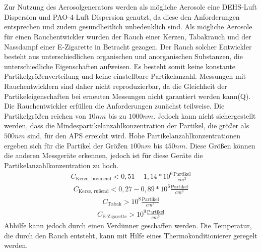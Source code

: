 \\\\
Zur Nutzung des Aerosolgenerators werden als m\"{o}gliche Aerosole eine DEHS-Luft Dispersion und PAO-4-Luft Dispersion genutzt, da diese den Anforderungen entsprechen und zudem gesundheitlich unbedenklich sind. Als m\"{o}gliche Aerosole f\"{u}r einen Rauchentwickler wurden der Rauch einer Kerzen, Tabakrauch und der Nassdampf einer E-Zigarette in Betracht gezogen. Der Rauch solcher Entwickler besteht aus unterschiedlichen organischen und anorganischen Substanzen, die unterschiedliche Eigenschaften aufweisen. Es besteht somit keine konstante Partikelgr\"{o}{\ss}enverteilung und keine einstellbare Partikelanzahl. Messungen mit Rauchentwicklern sind daher nicht reproduzierbar, da die Gleichheit der Partikeleigenschaften bei erneuten Messungen nicht garantiert werden kann(Q). Die Rauchentwickler erf\"{u}llen die Anforderungen zun\"{a}chst teilweise. Die Partikelgr\"{o}{\ss}en reichen von \(10 nm\) bis zu \(1000 nm\). Jedoch kann nicht sichergestellt werden, dass die Mindespartikelanzahlkonzentration der Partikel, die gr\"{o}{\ss}er als \(500 nm\) sind, f\"{u}r den APS erreicht wird. Hohe Partikelanzahlkonzentrationen ergeben sich f\"{u}r die Partikel der Gr\"{o}{\ss}en \(100 nm\) bis \(450 nm\). Diese Gr\"{o}{\ss}en k\"{o}nnen die anderen Messger\"{a}te erkennen, jedoch ist f\"{u}r diese Ger\"{a}te die Partikelanzahlkonzentration zu hoch.
\begin{align*}
C_\text{Kerze, brennend} < 0,51 - 1,14 * 10^6 \frac{\text{Partikel}}{cm^3}
\end{align*}
\begin{align*}
C_\text{Kerze, ru{\ss}end} < 0,27 - 0,89 * 10^6 \frac{\text{Partikel}}{cm^3}
\end{align*}
\begin{align*}
C_\text{Tabak} > 10^8 \frac{\text{Partikel}}{cm^3}
\end{align*}
\begin{align*}
C_\text{E-Zigarette} > 10^9 \frac{\text{Partikel}}{cm^3}
\end{align*}
Abhilfe kann jedoch durch einen Verd\"{u}nner geschaffen werden. Die Temperatur, die durch den Rauch entsteht, kann mit Hilfe eines Thermokonditionierer geregelt werden.
\\\\
